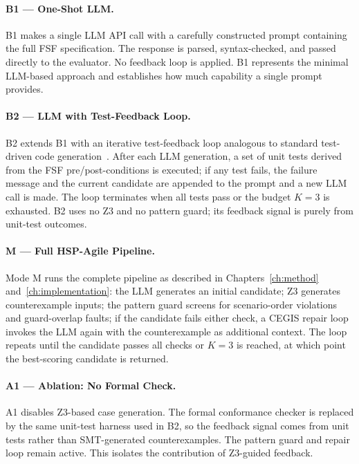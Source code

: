 \paragraph{B1 --- One-Shot LLM.}
B1 makes a single LLM API call with a carefully constructed prompt containing the
full FSF specification.  The response is parsed, syntax-checked, and passed directly
to the evaluator.  No feedback loop is applied.  B1 represents the minimal
LLM-based approach and establishes how much capability a single prompt provides.

\paragraph{B2 --- LLM with Test-Feedback Loop.}
B2 extends B1 with an iterative test-feedback loop analogous to standard
test-driven code generation~\citep{zhu1997specification}.  After each LLM generation, a set of
unit tests derived from the FSF pre/post-conditions is executed; if any test fails,
the failure message and the current candidate are appended to the prompt and a new
LLM call is made.  The loop terminates when all tests pass or the budget $K=3$ is
exhausted.  B2 uses no Z3 and no pattern guard; its feedback signal is purely from
unit-test outcomes.

\paragraph{M --- Full HSP-Agile Pipeline.}
Mode M runs the complete pipeline as described in
Chapters~\ref{ch:method} and~\ref{ch:implementation}: the LLM generates an initial
candidate; Z3 generates counterexample inputs; the pattern guard screens for
scenario-order violations and guard-overlap faults; if the candidate fails either
check, a CEGIS repair loop invokes the LLM again with the counterexample as
additional context.  The loop repeats until the candidate passes all checks or $K=3$
is reached, at which point the best-scoring candidate is returned.

\paragraph{A1 --- Ablation: No Formal Check.}
A1 disables Z3-based case generation.  The formal conformance checker is replaced
by the same unit-test harness used in B2, so the feedback signal comes from
unit tests rather than SMT-generated counterexamples.  The pattern guard and repair
loop remain active.  This isolates the contribution of Z3-guided feedback.

